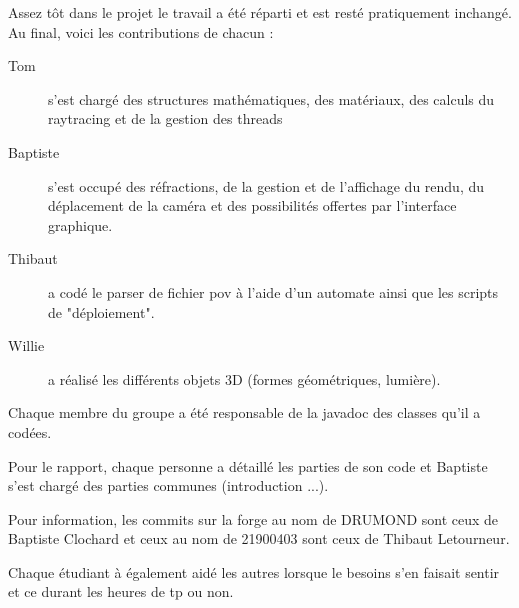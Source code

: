 Assez tôt dans le projet le travail a été réparti et est resté pratiquement inchangé. Au final, voici les contributions de chacun :
\begin{description}
    \item [Tom] s'est chargé des structures mathématiques, des matériaux, des calculs du raytracing et de la gestion des threads
    \item [Baptiste] s'est occupé des réfractions, de la gestion et de l'affichage du rendu, du déplacement de la caméra et des possibilités offertes par l'interface graphique.
    \item [Thibaut] a codé le parser de fichier pov à l'aide d'un automate ainsi que les scripts de "déploiement".
    \item [Willie] a réalisé les différents objets 3D (formes géométriques, lumière).
\end{description}

Chaque membre du groupe a été responsable de la javadoc des classes qu'il a codées.

Pour le rapport, chaque personne a détaillé les parties de son code et Baptiste s'est chargé des parties communes (introduction ...).

Pour information, les commits sur la forge au nom de DRUMOND sont ceux de Baptiste Clochard et ceux au nom de 21900403 sont ceux de Thibaut Letourneur.

Chaque étudiant à également aidé les autres lorsque le besoins s'en faisait sentir et ce durant les heures de tp ou non.
